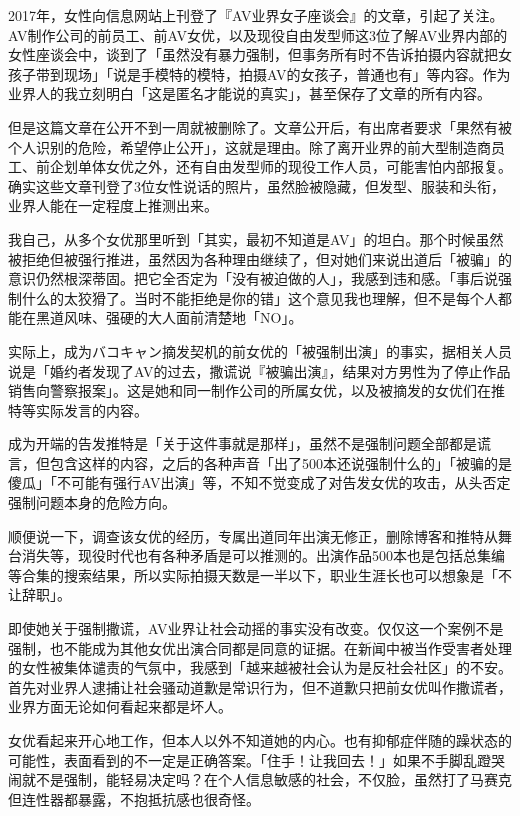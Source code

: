 \documentclass[12pt,UTF8]{ctexbook}
\begin{document}
2017年，女性向信息网站上刊登了『AV业界女子座谈会』的文章，引起了关注。AV制作公司的前员工、前AV女优，以及现役自由发型师这3位了解AV业界内部的女性座谈会中，谈到了「虽然没有暴力强制，但事务所有时不告诉拍摄内容就把女孩子带到现场」「说是手模特的模特，拍摄AV的女孩子，普通也有」等内容。作为业界人的我立刻明白「这是匿名才能说的真实」，甚至保存了文章的所有内容。

但是这篇文章在公开不到一周就被删除了。文章公开后，有出席者要求「果然有被个人识别的危险，希望停止公开」，这就是理由。除了离开业界的前大型制造商员工、前企划单体女优之外，还有自由发型师的现役工作人员，可能害怕内部报复。确实这些文章刊登了3位女性说话的照片，虽然脸被隐藏，但发型、服装和头衔，业界人能在一定程度上推测出来。

我自己，从多个女优那里听到「其实，最初不知道是AV」的坦白。那个时候虽然被拒绝但被强行推进，虽然因为各种理由继续了，但对她们来说出道后「被骗」的意识仍然根深蒂固。把它全否定为「没有被迫做的人」，我感到违和感。「事后说强制什么的太狡猾了。当时不能拒绝是你的错」这个意见我也理解，但不是每个人都能在黑道风味、强硬的大人面前清楚地「NO」。

实际上，成为バコキャン摘发契机的前女优的「被强制出演」的事实，据相关人员说是「婚约者发现了AV的过去，撒谎说『被骗出演』，结果对方男性为了停止作品销售向警察报案」。这是她和同一制作公司的所属女优，以及被摘发的女优们在推特等实际发言的内容。

成为开端的告发推特是「关于这件事就是那样」，虽然不是强制问题全部都是谎言，但包含这样的内容，之后的各种声音「出了500本还说强制什么的」「被骗的是傻瓜」「不可能有强行AV出演」等，不知不觉变成了对告发女优的攻击，从头否定强制问题本身的危险方向。

顺便说一下，调查该女优的经历，专属出道同年出演无修正，删除博客和推特从舞台消失等，现役时代也有各种矛盾是可以推测的。出演作品500本也是包括总集编等合集的搜索结果，所以实际拍摄天数是一半以下，职业生涯长也可以想象是「不让辞职」。

即使她关于强制撒谎，AV业界让社会动摇的事实没有改变。仅仅这一个案例不是强制，也不能成为其他女优出演合同都是同意的证据。在新闻中被当作受害者处理的女性被集体谴责的气氛中，我感到「越来越被社会认为是反社会社区」的不安。首先对业界人逮捕让社会骚动道歉是常识行为，但不道歉只把前女优叫作撒谎者，业界方面无论如何看起来都是坏人。

女优看起来开心地工作，但本人以外不知道她的内心。也有抑郁症伴随的躁状态的可能性，表面看到的不一定是正确答案。「住手！让我回去！」如果不手脚乱蹬哭闹就不是强制，能轻易决定吗？在个人信息敏感的社会，不仅脸，虽然打了马赛克但连性器都暴露，不抱抵抗感也很奇怪。
\end{document}
